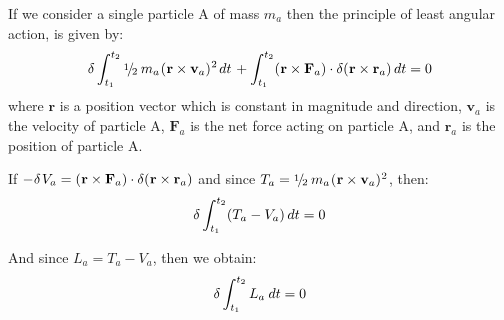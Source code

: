 \documentclass[10pt]{article}
\newcommand{\mM}{m}
\newcommand{\mL}{L}
\newcommand{\mT}{T}
\newcommand{\mV}{V}
\newcommand{\ra}{_a}
\newcommand{\vR}{\mathbf{r}}
\newcommand{\vV}{\mathbf{v}}
\newcommand{\vF}{\mathbf{F}}
\newcommand{\med}{\raise.5ex\hbox{$\scriptstyle 1$}\kern-.15em/\kern-.15em\lower.25ex\hbox{$\scriptstyle 2$}}
\begin{document}
\par If we consider a single particle A of mass $\mM\ra$ then the principle of least angular action, is given by:
\begin{eqnarray*}
\delta \int_{t_1}^{t_2} \med \hspace{+0.24em} \mM\ra \hspace{+0.06em} (\hspace{+0.03em} \vR \times \vV\ra)^{\hspace{+0.03em} 2} \hspace{+0.12em} dt \hspace{+0.12em} + \int_{t_1}^{t_2} (\hspace{+0.03em} \vR \times \vF\ra) \cdot \delta (\hspace{+0.03em} \vR \times \vR\ra) \hspace{+0.18em} dt = 0
\end{eqnarray*}
\noindent where $\vR$ is a position vector which is constant in magnitude and direction, $\vV\ra$ is the velocity of particle A, $\vF\ra$ is the net force acting on particle A, and $\vR\ra$ is the position of particle A.
\medskip
\par If $- \hspace{+0.03em} \delta \hspace{+0.09em} \mV\ra = (\hspace{+0.03em} \vR \times \vF\ra) \cdot \delta (\hspace{+0.03em} \vR \times \vR\ra)$ and since $\mT\ra = \med \hspace{+0.24em} \mM\ra \hspace{+0.06em} (\hspace{+0.03em} \vR \times \vV\ra)^{\hspace{+0.03em} 2}$, then:
\begin{eqnarray*}
\delta \int_{t_1}^{t_2} (\mT\ra - \mV\ra) \hspace{+0.18em} dt = 0
\end{eqnarray*}
\par And since $\mL\ra = \mT\ra - \mV\ra$, then we obtain:
\begin{eqnarray*}
\delta \int_{t_1}^{t_2} \mL\ra \hspace{+0.24em} dt = 0
\end{eqnarray*}
\end{document}

